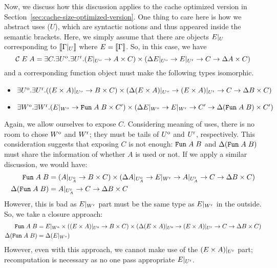 \documentclass{article}
\theoremstyle{definition}
\begin{document}
Now, we discuss how this discussion applies to the cache optimized version in Section~\ref{sec:cache-size-optimized-version}.
One thing to care here is how we abstract uses ($U$), which are syntactic notions and thus appeared inside the semantic brackets. Here, we simply assume that there 
are objects $E|_{U}$ corresponding to $\sem{\Restrict{\Gamma}{U}}$ where $E = \sem{\Gamma}$.
So, in this case, we have 
\[
\mathcal{C} \; E \; A = \exists C. \exists U^\mathrm{o}. \exists U^\mathrm{r}. 
  (E|_{U^\mathrm{o}} \to {A} \times C) \times 
  (\Delta E|_{U^\mathrm{o}} \to E|_{U^\mathrm{r}} \to C \to \Delta A \times C)
\]
and a corresponding function object must make the following types isomorphic. 
\begin{itemize}
 \item \(
   \exists U^\mathrm{o}. \exists U^\mathrm{r}. 
   ((E \times A)|_{U^\mathrm{o}} \to {B} \times C) \times 
   (\Delta (E \times A)|_{U^\mathrm{o}} \to (E \times A)|_{U^\mathrm{r}} \to C \to \Delta B \times C)
   \) 
 \item \(
   \exists W^\mathrm{o}. \exists W^\mathrm{r}. 
   (E|_{W^\mathrm{o}} \to \texttt{Fun} \; A \; B \times C') \times 
   (\Delta E|_{W^\mathrm{o}} \to E|_{W^\mathrm{r}} \to C' \to \Delta (\texttt{Fun} \; A \; B) \times C')
   \)
\end{itemize} 
Again, we allow ourselves to expose $C$. 
Considering meaning of uses, there is no room to chose $W^\mathrm{o}$ and $W^\mathrm{r}$; they must be tails of $U^\mathrm{o}$ and $U^\mathrm{r}$, respectively. This consideration suggests
that exposing $C$ is not enough: $\texttt{Fun} \; A \; B$ and $\Delta (\texttt{Fun} \; A \; B)$ must share the information of whether $A$ is used or not.  
If we apply a similar discussion, we would have: 
\begin{align*}
\texttt{Fun} \; A \; B &= (A|_{U_A^\mathrm{o}} \to B \times C) \times (\Delta A|_{U_A^\mathrm{o}} \to E|_{W^\mathrm{r}} \to A|_{U_A^\mathrm{r}} \to C \to \Delta B \times C)\\
\Delta (\texttt{Fun} \; A \; B) &= A|_{U_A^\mathrm{r}} \to C \to \Delta B \times C
\end{align*}
However, this is bad as $E|_{W^\mathrm{r}}$ part must be the same type as $E|_{W^\mathrm{r}}$ in the outside. 
So, we take a closure approach: 
\begin{align*}
\texttt{Fun} \; A \; B &= E|_{W^\mathrm{o}} \times    
                ((E \times A)|_{U^\mathrm{o}} \to {B} \times C) \times 
                (\Delta (E \times A)|_{U^\mathrm{o}} \to (E \times A)|_{U^\mathrm{r}} \to C \to \Delta B \times C)\\
\Delta (\texttt{Fun} \; A \; B) &= \Delta (E|_{W^\mathrm{o}}) 
\end{align*}
However, even with this approach, we cannot make use of the $(E \times A)|_{U^\mathrm{r}}$ part; recomputation is necessary as no one pass appropriate $E|_{U^\mathrm{r}}$.
\end{document}
